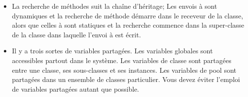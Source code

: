 \documentclass[a4paper,10pt,twoside]{book}
\begin{document}
\begin{itemize}
  \item La recherche de méthodes suit la chaîne d'héritage;
        Les envois à \self sont dynamiques et la recherche de méthode
        démarre dans le receveur de la classe, alors que
        celles à \super sont statiques et la recherche commence dans la super-classe de la 
        classe dans laquelle l'envoi à \super est écrit.

  \item Il y a trois sortes de variables partagées.
        Les variables globales sont accessibles partout dans le système.
        Les variables de classe sont partagées entre une classe, ses sous-classes et ses instances.
        Les variables de pool sont partagées dans un ensemble de classes particulier.
        Vous devez éviter l'emploi de variables partagées autant que possible.

\end{itemize}

\ifx\wholebook\relax\else
   
   
\end{document}
